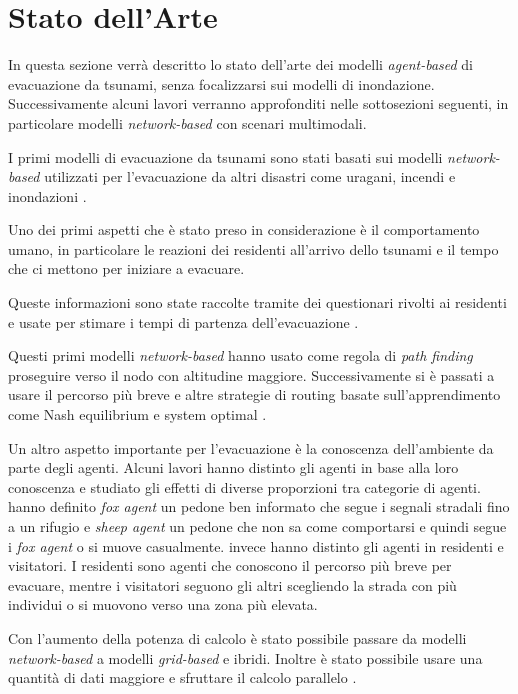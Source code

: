 \section{Stato dell'Arte}
\label{sec:stato-arte}
In questa sezione verrà descritto lo stato dell'arte dei modelli \textit{agent-based} di evacuazione da tsunami, senza focalizzarsi sui modelli di inondazione.
Successivamente alcuni lavori verranno approfonditi nelle sottosezioni seguenti, in particolare modelli \textit{network-based} con scenari multimodali.

I primi modelli di evacuazione da tsunami sono stati basati sui modelli \textit{network-based} utilizzati per l'evacuazione da altri disastri come
uragani, incendi e inondazioni \parencite{usuzawa1997development, imamura2001development}.

Uno dei primi aspetti che è stato preso in considerazione è il comportamento umano,
in particolare le reazioni dei residenti all'arrivo dello tsunami
e il tempo che ci mettono per iniziare a evacuare.

Queste informazioni sono state raccolte tramite dei questionari rivolti ai residenti
e usate per stimare i tempi di partenza dell'evacuazione \parencite{imamura2001development, saito2004simulation}.

Questi primi modelli \textit{network-based} hanno usato come regola di \textit{path finding}
proseguire verso il nodo con altitudine maggiore.
Successivamente si è passati a usare il percorso
più breve \parencite{katada2004disaster} e altre strategie di routing basate sull'apprendimento 
come Nash equilibrium e system optimal \parencite{lammel2009towards}.

Un altro aspetto importante per l'evacuazione è la conoscenza dell'ambiente da parte degli agenti.
Alcuni lavori hanno distinto gli agenti in base alla loro conoscenza e
studiato gli effetti di diverse proporzioni tra categorie di agenti.
\textcite{nguyen2012simulation} hanno definito \textit{fox agent} un pedone ben informato che segue i segnali
stradali fino a un rifugio e \textit{sheep agent} un pedone che non sa
come comportarsi e quindi segue i \textit{fox agent} o si muove casualmente.
\textcite{takabatake2017simulated} invece hanno distinto gli agenti in residenti e visitatori.
I residenti sono agenti che conoscono il percorso più breve per evacuare, mentre i visitatori
seguono gli altri scegliendo la strada con più individui o si muovono verso una zona più elevata.

Con l'aumento della potenza di calcolo è stato possibile passare da modelli \textit{network-based} a modelli \textit{grid-based} e ibridi.
Inoltre è stato possibile usare una quantità di dati maggiore e sfruttare il calcolo parallelo \parencite{wijerathne2013hpc, makinoshima2018enhancing}.

